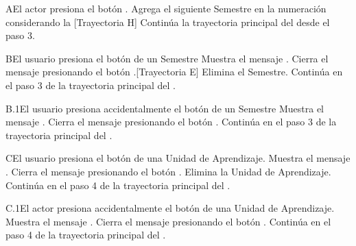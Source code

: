 \begin{UCtrayectoriaA}{A}{El actor presiona el botón \IUbutton{+}.}
	\UCpaso Agrega el siguiente Semestre en la numeración considerando la [Trayectoria H]
    \UCpaso Continúa la trayectoria principal del  desde el paso 3.
\end{UCtrayectoriaA}
\begin{UCtrayectoriaA}{B}{El usuario presiona el botón  de un Semestre}
	\UCpaso  Muestra el mensaje .
	\UCpaso[\UCactor] Cierra el mensaje presionando el botón .[Trayectoria E]
	\UCpaso Elimina el Semestre.
    \UCpaso Continúa en el paso 3 de la trayectoria principal del .
\end{UCtrayectoriaA}
\begin{UCtrayectoriaA}{B.1}{El usuario presiona accidentalmente el botón  de un Semestre}
	\UCpaso  Muestra el mensaje .
	\UCpaso[\UCactor] Cierra el mensaje presionando el botón .
    \UCpaso Continúa en el paso 3 de la trayectoria principal del .
\end{UCtrayectoriaA}
\begin{UCtrayectoriaA}{C}{El usuario presiona el botón  de una Unidad de Aprendizaje.}
	\UCpaso  Muestra el mensaje .
	\UCpaso[\UCactor] Cierra el mensaje presionando el botón .
	\UCpaso Elimina la Unidad de Aprendizaje.
    \UCpaso Continúa en el paso 4 de la trayectoria principal del .
\end{UCtrayectoriaA}
\begin{UCtrayectoriaA}{C.1}{El actor presiona accidentalmente el botón  de una Unidad de Aprendizaje.}
	\UCpaso Muestra el mensaje .
	\UCpaso[\UCactor] Cierra el mensaje presionando el botón .
    \UCpaso Continúa en el paso 4 de la trayectoria principal del .
\end{UCtrayectoriaA}


